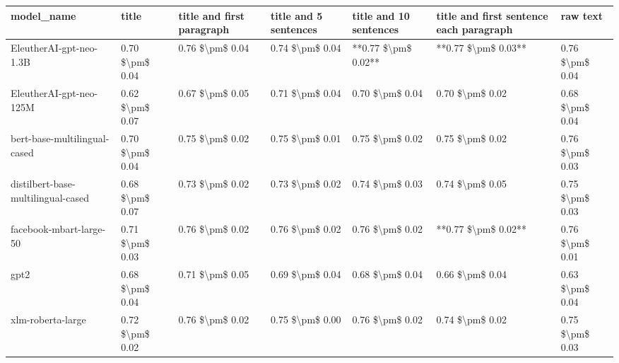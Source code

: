 \begin{tabular}{lllllll}
\toprule
                        model\_name &           title & title and first paragraph & title and 5 sentences & title and 10 sentences & title and first sentence each paragraph &        raw text \\
\midrule
           EleutherAI-gpt-neo-1.3B & 0.70 \$\textbackslash pm\$ 0.04 &           0.76 \$\textbackslash pm\$ 0.04 &       0.74 \$\textbackslash pm\$ 0.04 &    **0.77 \$\textbackslash pm\$ 0.02** &                     **0.77 \$\textbackslash pm\$ 0.03** & 0.76 \$\textbackslash pm\$ 0.04 \\
           EleutherAI-gpt-neo-125M & 0.62 \$\textbackslash pm\$ 0.07 &           0.67 \$\textbackslash pm\$ 0.05 &       0.71 \$\textbackslash pm\$ 0.04 &        0.70 \$\textbackslash pm\$ 0.04 &                         0.70 \$\textbackslash pm\$ 0.02 & 0.68 \$\textbackslash pm\$ 0.04 \\
      bert-base-multilingual-cased & 0.70 \$\textbackslash pm\$ 0.04 &           0.75 \$\textbackslash pm\$ 0.02 &       0.75 \$\textbackslash pm\$ 0.01 &        0.75 \$\textbackslash pm\$ 0.02 &                         0.75 \$\textbackslash pm\$ 0.02 & 0.76 \$\textbackslash pm\$ 0.03 \\
distilbert-base-multilingual-cased & 0.68 \$\textbackslash pm\$ 0.07 &           0.73 \$\textbackslash pm\$ 0.02 &       0.73 \$\textbackslash pm\$ 0.02 &        0.74 \$\textbackslash pm\$ 0.03 &                         0.74 \$\textbackslash pm\$ 0.05 & 0.75 \$\textbackslash pm\$ 0.03 \\
           facebook-mbart-large-50 & 0.71 \$\textbackslash pm\$ 0.03 &           0.76 \$\textbackslash pm\$ 0.02 &       0.76 \$\textbackslash pm\$ 0.02 &        0.76 \$\textbackslash pm\$ 0.02 &                     **0.77 \$\textbackslash pm\$ 0.02** & 0.76 \$\textbackslash pm\$ 0.01 \\
                              gpt2 & 0.68 \$\textbackslash pm\$ 0.04 &           0.71 \$\textbackslash pm\$ 0.05 &       0.69 \$\textbackslash pm\$ 0.04 &        0.68 \$\textbackslash pm\$ 0.04 &                         0.66 \$\textbackslash pm\$ 0.04 & 0.63 \$\textbackslash pm\$ 0.04 \\
                 xlm-roberta-large & 0.72 \$\textbackslash pm\$ 0.02 &           0.76 \$\textbackslash pm\$ 0.02 &       0.75 \$\textbackslash pm\$ 0.00 &        0.76 \$\textbackslash pm\$ 0.02 &                         0.74 \$\textbackslash pm\$ 0.02 & 0.75 \$\textbackslash pm\$ 0.03 \\
\bottomrule
\end{tabular}
